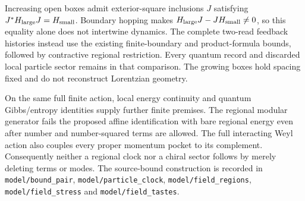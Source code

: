 Increasing open boxes admit exterior-square inclusions $J$ satisfying
$J^*H_{\rm large}J=H_{\rm small}$. Boundary hopping makes
$H_{\rm large}J-JH_{\rm small}\ne0$, so this equality alone does not
intertwine dynamics. The complete two-read feedback histories instead use
the existing finite-boundary and product-formula bounds, followed by
contractive regional restriction. Every quantum record and discarded local
particle sector remains in that comparison. The growing boxes hold
spacing fixed and do not reconstruct Lorentzian geometry.

On the same full finite action, local energy continuity and quantum
Gibbs/entropy identities supply further finite premises. The regional
modular generator fails the proposed affine identification with bare
regional energy even after number and number-squared terms are allowed.
The full interacting Weyl action also couples every proper momentum pocket
to its complement. Consequently neither a regional clock nor a chiral
sector follows by merely deleting terms or modes. The source-bound
construction is recorded in \texttt{model/bound\_pair},
\texttt{model/particle\_clock}, \texttt{model/field\_regions},
\texttt{model/field\_stress} and \texttt{model/field\_tastes}.

